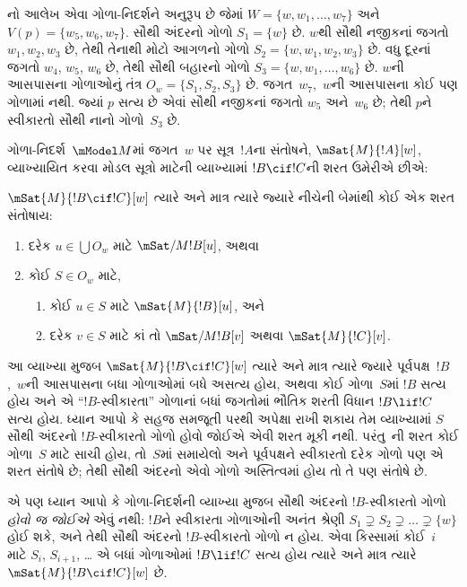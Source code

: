 નો આલેખ એવા ગોળા-નિદર્શને અનુરૂપ છે જેમાં
$W = \{w, w_1, \dots, w_7\}$ અને $V(p) = \{w_5, w_6,
w_7\}$. સૌથી અંદરનો ગોળો $S_1 = \{w\}$ છે. $w$થી સૌથી નજીકનાં
જગતો $w_1, w_2, w_3$ છે, તેથી તેનાથી મોટો આગળનો ગોળો
$S_2 = \{w, w_1, w_2, w_3\}$ છે. વધુ દૂરનાં જગતો $w_4$, $w_5$,
$w_6$ છે, તેથી સૌથી બહારનો ગોળો
$S_3 = \{w, w_1, \dots, w_6\}$ છે. $w$ની આસપાસના ગોળાઓનું તંત્ર
$O_w = \{S_1, S_2, S_3\}$ છે. જગત~$w_7$,~$w$ની આસપાસના કોઈ
પણ ગોળામાં નથી. જ્યાં $p$ સત્ય છે એવાં સૌથી નજીકનાં જગતો $w_5$
અને~$w_6$ છે; તેથી $p$ને સ્વીકારતો સૌથી નાનો ગોળો~$S_3$ છે.

ગોળા-નિદર્શ~$\mModel M$માં જગત~$w$ પર સૂત્ર~$!A$ના સંતોષને,
$\mSat{M}{!A}[w]$, વ્યાખ્યાયિત કરવા મોડલ સૂત્રો માટેની
વ્યાખ્યામાં $!B \cif !C$ની શરત ઉમેરીએ છીએ:

\begin{defn}
  $\mSat{M}{!B \cif !C}[w]$ ત્યારે અને માત્ર ત્યારે જ્યારે નીચેની
  બેમાંથી કોઈ એક શરત સંતોષાય:
  \begin{enumerate}
  \item{} દરેક $u \in \bigcup O_w$ માટે $\mSat/{M}{!B}[u]$, અથવા
  \item{} કોઈ $S \in O_w$ માટે,
    \begin{enumerate}
      \item કોઈ $u \in
        S$ માટે $\mSat{M}{!B}[u]$, અને
      \item દરેક $v \in S$ માટે કાં તો
        $\mSat/{M}{!B}[v]$ અથવા $\mSat{M}{!C}[v]$.
    \end{enumerate}
  \end{enumerate}
\end{defn}

આ વ્યાખ્યા મુજબ $\mSat{M}{!B \cif !C}[w]$ ત્યારે અને માત્ર ત્યારે
જ્યારે પૂર્વપક્ષ~$!B$,~$w$ની આસપાસના બધા ગોળાઓમાં બધે અસત્ય હોય,
અથવા કોઈ ગોળા~$S$માં $!B$ સત્ય હોય અને એ ``$!B$-સ્વીકારતા''
ગોળાનાં બધાં જગતોમાં ભૌતિક શરતી વિધાન $!B \lif !C$ સત્ય હોય.
ધ્યાન આપો કે સહજ સમજૂતી પરથી અપેક્ષા રાખી શકાય તેમ વ્યાખ્યામાં
$S$ સૌથી અંદરનો $!B$-સ્વીકારતો ગોળો હોવો જોઈએ એવી શરત મૂકી
નથી. પરંતુ~ની શરત કોઈ ગોળા~$S$ માટે સાચી
હોય, તો~$S$માં સમાયેલો અને પૂર્વપક્ષને સ્વીકારતો દરેક ગોળો પણ એ
શરત સંતોષે છે; તેથી સૌથી અંદરનો એવો ગોળો અસ્તિત્વમાં
હોય તો તે પણ સંતોષે છે.

એ પણ ધ્યાન આપો કે ગોળા-નિદર્શની વ્યાખ્યા મુજબ સૌથી અંદરનો
$!B$-સ્વીકારતો ગોળો \emph{હોવો જ જોઈએ} એવું નથી: $!B$ને સ્વીકારતા
ગોળાઓની અનંત શ્રેણી $S_1 \supsetneq S_2 \supsetneq \dots \supsetneq
\{w\}$ હોઈ શકે, અને તેથી સૌથી અંદરનો $!B$-સ્વીકારતો ગોળો ન હોય.
એવા કિસ્સામાં કોઈ~$i$ માટે $S_i$, $S_{i+1}$, \dots{} એ બધાં ગોળાઓમાં
$!B \lif !C$ સત્ય હોય ત્યારે અને માત્ર ત્યારે
$\mSat{M}{!B \cif !C}[w]$ છે.
\endgroup


